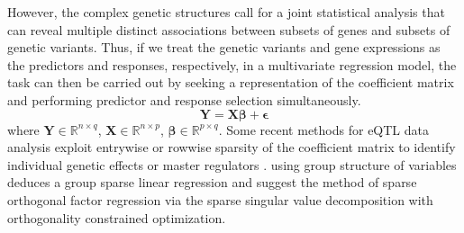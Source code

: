 However, the complex genetic structures call for a joint statistical analysis that can reveal multiple distinct associations between subsets of genes and subsets of genetic variants. 
Thus, if we treat the genetic variants and gene expressions as the predictors and responses, respectively, in a multivariate regression model, the task can then be carried out by seeking a representation of the coefficient matrix and performing predictor and response selection simultaneously. 
\begin{equation}\label{eq:multi y}
    \mathbf{Y} = \mathbf{X} \boldsymbol{\beta} + \boldsymbol{\epsilon}
\end{equation}
where $\mathbf{Y}\in\mathbb{R}^{n\times q}$, $\mathbf{X}\in\mathbb{R}^{n\times p}$, $\boldsymbol{\beta}\in\mathbb{R}^{p\times q}$. 
Some recent methods for eQTL data analysis exploit entrywise or rowwise sparsity of the coefficient matrix to identify individual genetic effects or master regulators \citep{peng2010regularized}. \cite{dai2016knockoff} using group structure of variables deduces a group sparse linear regression and \cite{uematsu2019sofar} suggest the method of sparse orthogonal factor regression via the sparse singular value decomposition with orthogonality constrained optimization. 



